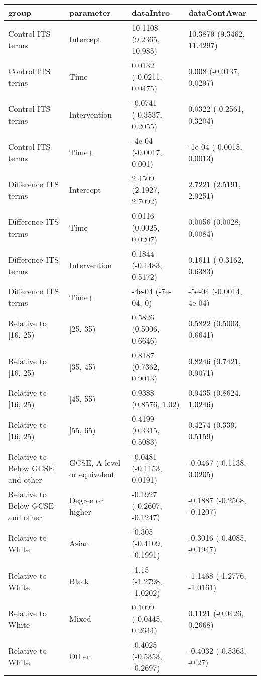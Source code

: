 \begin{table}[ht]
\centering
\begin{tabular}{llll}
  \hline
group & parameter & dataIntro & dataContAwar \\ 
  \hline
Control ITS terms & Intercept & 10.1108 (9.2365, 10.985) & 10.3879 (9.3462, 11.4297) \\ 
  Control ITS terms & Time & 0.0132 (-0.0211, 0.0475) & 0.008 (-0.0137, 0.0297) \\ 
  Control ITS terms & Intervention & -0.0741 (-0.3537, 0.2055) & 0.0322 (-0.2561, 0.3204) \\ 
  Control ITS terms & Time+ & -4e-04 (-0.0017, 0.001) & -1e-04 (-0.0015, 0.0013) \\ 
  Difference ITS terms & Intercept & 2.4509 (2.1927, 2.7092) & 2.7221 (2.5191, 2.9251) \\ 
  Difference ITS terms & Time & 0.0116 (0.0025, 0.0207) & 0.0056 (0.0028, 0.0084) \\ 
  Difference ITS terms & Intervention & 0.1844 (-0.1483, 0.5172) & 0.1611 (-0.3162, 0.6383) \\ 
  Difference ITS terms & Time+ & -4e-04 (-7e-04, 0) & -5e-04 (-0.0014, 4e-04) \\ 
  Relative to [16, 25) & [25, 35) & 0.5826 (0.5006, 0.6646) & 0.5822 (0.5003, 0.6641) \\ 
  Relative to [16, 25) & [35, 45) & 0.8187 (0.7362, 0.9013) & 0.8246 (0.7421, 0.9071) \\ 
  Relative to [16, 25) & [45, 55) & 0.9388 (0.8576, 1.02) & 0.9435 (0.8624, 1.0246) \\ 
  Relative to [16, 25) & [55, 65) & 0.4199 (0.3315, 0.5083) & 0.4274 (0.339, 0.5159) \\ 
  Relative to Below GCSE and other & GCSE, A-level or equivalent & -0.0481 (-0.1153, 0.0191) & -0.0467 (-0.1138, 0.0205) \\ 
  Relative to Below GCSE and other & Degree or higher & -0.1927 (-0.2607, -0.1247) & -0.1887 (-0.2568, -0.1207) \\ 
  Relative to White & Asian & -0.305 (-0.4109, -0.1991) & -0.3016 (-0.4085, -0.1947) \\ 
  Relative to White & Black & -1.15 (-1.2798, -1.0202) & -1.1468 (-1.2776, -1.0161) \\ 
  Relative to White & Mixed & 0.1099 (-0.0445, 0.2644) & 0.1121 (-0.0426, 0.2668) \\ 
  Relative to White & Other & -0.4025 (-0.5353, -0.2697) & -0.4032 (-0.5363, -0.27) \\ 

\end{tabular}
\end{table}
